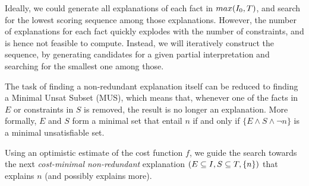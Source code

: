Ideally, we could generate all explanations of each fact in $max(I_0,T)$, and search for the lowest scoring sequence among those explanations.
However, the number of explanations for each fact quickly explodes with the number of constraints, and is hence not feasible to compute.
Instead, we will iteratively construct the sequence, by generating candidates for a given partial interpretation and searching for the smallest one among those.


The task of finding a non-redundant explanation itself can be reduced to finding a Minimal Unsat Subset (MUS), which means that, whenever one of the facts in $E$ or constraints in $S$ is removed, the result is no longer an explanation.
More formally, $E$ and $S$ form a minimal set that entail $n$ if and only if $\{E \land S \land \lnot n\}$ is a minimal unsatisfiable set.

Using an optimistic estimate of the cost function $f$, we guide the search towards the next \emph{cost-minimal non-redundant} explanation $(E \subseteq I, S \subseteq T,\{n\})$ that explains $n$ (and possibly explains more).


